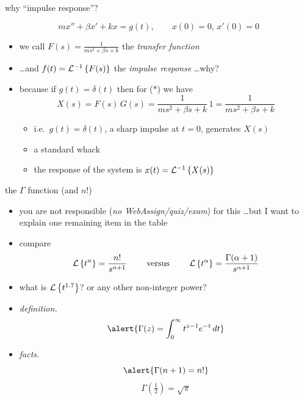 \documentclass[urlcolor=blue,dvipsnames]{beamer}
\begin{document}
\begin{frame}{why ``impulse response''?}

\begin{equation}
m x'' + \beta x' + k x = g(t), \qquad x(0)=0, \, x'(0)=0 \tag{$\ast$}
\end{equation}

\begin{itemize}
\item we call $F(s) = \frac{1}{ms^2+\beta s+k}$ the \emph{transfer function}
\item \dots and $f(t) = \mathcal{L}^{-1}\left\{F(s)\right\}$ the \emph{impulse response} \alert{\dots why?}
\item because if $g(t)=\delta(t)$ then for ($\ast$) we have
    $$X(s) = F(s) \, G(s) = \frac{1}{ms^2+\beta s+k} \, 1 = \frac{1}{ms^2+\beta s+k}$$
    \begin{itemize}
    \item i.e.~\alert{$g(t)=\delta(t)$, a sharp impulse at $t=0$, generates $X(s)$}
    \item a standard whack
    \item the response of the system is $x(t)=\mathcal{L}^{-1}\left\{X(s)\right\}$
    \end{itemize}
\end{itemize}
\end{frame}


\begin{frame}{the $\Gamma$ function (and $n!$)}

\begin{itemize}
\item you are not responsible (\emph{no WebAssign/quiz/exam}) for this  \dots but I want to explain one remaining item in the table
\item compare
    $$\mathcal{L}\left\{t^n\right\} = \frac{n!}{s^{n+1}} \qquad \text{ versus } \qquad \mathcal{L}\left\{t^\alpha\right\} = \frac{\Gamma(\alpha+1)}{s^{\alpha+1}}$$
\item what is $\mathcal{L}\left\{t^{1.7}\right\}$?  or any other non-integer power?
\item \emph{definition.}
    $$\alert{\Gamma(z) = \int_0^\infty t^{z-1} e^{-t}\,dt}$$
\item \emph{facts.}
    $$\alert{\Gamma(n+1) = n!}$$
    $$\Gamma(\tfrac{1}{2}) = \sqrt{\pi}$$
\end{itemize}
\end{frame}
\end{document}
